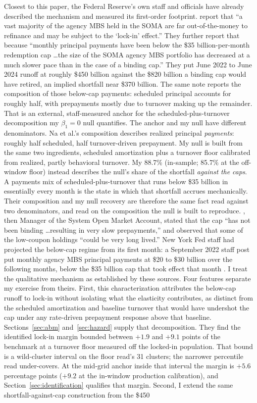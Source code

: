 \documentclass[12pt]{article}
\begin{document}
Closest to this paper, the Federal Reserve's own staff and officials have already described the mechanism and measured its first-order footprint. \citet{na2024} report that ``a vast majority of the agency MBS held in the SOMA are far out-of-the-money to refinance and may be subject to the `lock-in' effect.'' They further report that because ``monthly principal payments have been below the \$35 billion-per-month redemption cap \ldots the size of the SOMA agency MBS portfolio has decreased at a much slower pace than in the case of a binding cap.'' They put June 2022 to June 2024 runoff at roughly \$450 billion against the \$820 billion a binding cap would have retired, an implied shortfall near \$370 billion. The same note reports the composition of those below-cap payments: scheduled principal accounts for roughly half, with prepayments mostly due to turnover making up the remainder. That is an external, staff-measured anchor for the scheduled-plus-turnover decomposition my $\beta_1 = 0$ null quantifies. The anchor and my null have different denominators. Na et al.'s composition describes realized principal \emph{payments}: roughly half scheduled, half turnover-driven prepayment. My null is built from the same two ingredients, scheduled amortization plus a turnover floor calibrated from realized, partly behavioral turnover. My 88.7\% (in-sample; 85.7\% at the off-window floor) instead describes the null's share of the shortfall \emph{against the caps}. A payments mix of scheduled-plus-turnover that runs below \$35 billion in essentially every month is the state in which that shortfall accrues mechanically. Their composition and my null recovery are therefore the same fact read against two denominators, and read on the composition the null is built to reproduce. \citet{perli2024}, then Manager of the System Open Market Account, stated that the cap ``has not been binding \ldots resulting in very slow prepayments,'' and \citet{hammack2025} observed that some of the low-coupon holdings ``could be very long lived.'' New York Fed staff had projected the below-cap regime from its first month: a September 2022 staff post put monthly agency MBS principal payments at \$20 to \$30 billion over the following months, below the \$35 billion cap that took effect that month \citep{nyfed2022}. I treat the qualitative mechanism as established by these sources. Four features separate my exercise from theirs. First, this characterization attributes the below-cap runoff to lock-in without isolating what the elasticity contributes, as distinct from the scheduled amortization and baseline turnover that would have undershot the cap under any rate-driven prepayment response above that baseline. Sections~\ref{sec:abm} and~\ref{sec:hazard} supply that decomposition. They find the identified lock-in margin bounded between $+1.9$ and $+9.1$ points of the benchmark at a turnover floor measured off the locked-in population. That bound is a wild-cluster interval on the floor read's 31 clusters; the narrower percentile read under-covers. At the mid-grid anchor inside that interval the margin is $+5.6$ percentage points ($+9.2$ at the in-window production calibration), and Section~\ref{sec:identification} qualifies that margin. Second, I extend the same shortfall-against-cap construction from the \$450 
\end{document}
